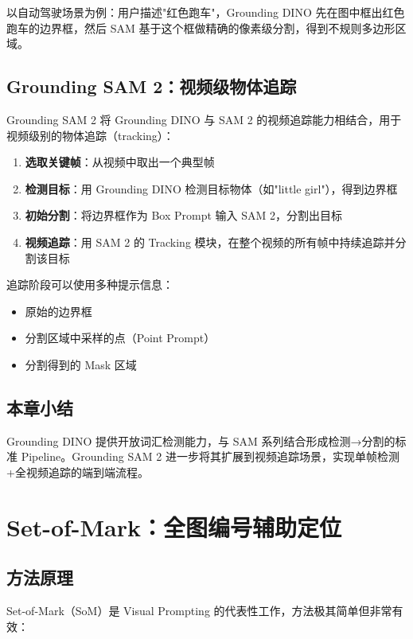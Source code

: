 \documentclass[a4paper]{article}
\begin{document}
以自动驾驶场景为例：用户描述"红色跑车"，Grounding DINO 先在图中框出红色跑车的边界框，然后 SAM 基于这个框做精确的像素级分割，得到不规则多边形区域。

\subsection{Grounding SAM 2：视频级物体追踪}

Grounding SAM 2 将 Grounding DINO 与 SAM 2 的视频追踪能力相结合，用于视频级别的物体追踪（tracking）：

\begin{enumerate}
    \item \textbf{选取关键帧}：从视频中取出一个典型帧
    \item \textbf{检测目标}：用 Grounding DINO 检测目标物体（如"little girl"），得到边界框
    \item \textbf{初始分割}：将边界框作为 Box Prompt 输入 SAM 2，分割出目标
    \item \textbf{视频追踪}：用 SAM 2 的 Tracking 模块，在整个视频的所有帧中持续追踪并分割该目标
\end{enumerate}

追踪阶段可以使用多种提示信息：
\begin{itemize}
    \item 原始的边界框
    \item 分割区域中采样的点（Point Prompt）
    \item 分割得到的 Mask 区域
\end{itemize}

\subsection{本章小结}

Grounding DINO 提供开放词汇检测能力，与 SAM 系列结合形成检测→分割的标准 Pipeline。Grounding SAM 2 进一步将其扩展到视频追踪场景，实现单帧检测+全视频追踪的端到端流程。


\section{Set-of-Mark：全图编号辅助定位}

\subsection{方法原理}

Set-of-Mark（SoM）是 Visual Prompting 的代表性工作，方法极其简单但非常有效：
\end{document}
